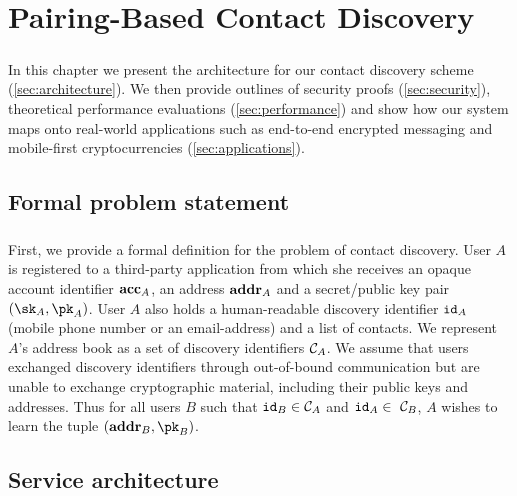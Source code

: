 \chapter{Pairing-Based Contact Discovery}
\label{chap:system}

\paragraph{} In this chapter we present the architecture for our contact discovery scheme (\autoref{sec:architecture}). We then provide outlines of security proofs (\autoref{sec:security}), theoretical performance evaluations (\autoref{sec:performance}) and show how our system maps onto real-world applications such as end-to-end encrypted messaging and mobile-first cryptocurrencies (\autoref{sec:applications}).


\section{Formal problem statement}
\label{sec:probstatement}

\paragraph{} First, we provide a formal definition for the problem of contact discovery. User $A$ is registered to a third-party application from which she receives an opaque account identifier $\mathbf{acc}_A$, an address $\mathbf{addr}_A$ and a secret/public key pair $(\sk_A,\pk_A)$. User $A$ also holds a human-readable discovery identifier $\mathtt{id}_A$ (mobile phone number or an email-address) and a list of contacts. We represent $A$'s address book as a set of discovery identifiers $\mathcal{C}_{A}$. We assume that users exchanged discovery identifiers through out-of-bound communication but are unable to exchange cryptographic material, including their public keys and addresses. Thus for all users $B$ such that $\mathtt{id}_B \in \mathcal{C}_{A}$ and $\mathtt{id}_A \in\ \mathcal{C}_{B}$, $A$ wishes to learn the tuple $(\addr_B, \pk_B)$.

\section{Service architecture}
\label{sec:architecture}

